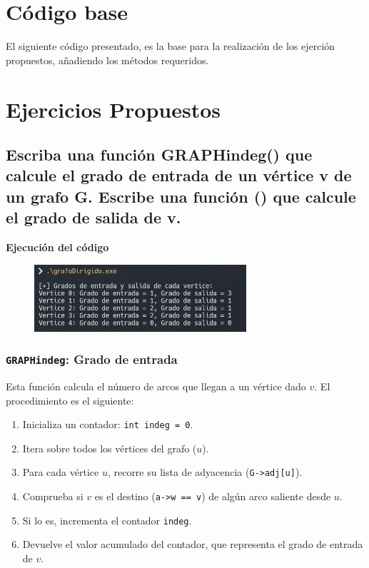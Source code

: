 \documentclass{article}
\begin{document}
\section{Código base}
    El siguiente código presentado, es la base para la realización de los ejerción propuestos, añadiendo los métodos requeridos. \\
    

    \newpage

\section{Ejercicios Propuestos}
    \subsection{Escriba una función GRAPHindeg() que calcule el grado de entrada de un vértice v de un grafo G. Escribe una función () que calcule el grado de salida de v.}

        

        \textbf{Ejecución del código}
            \begin{figure}[H]
            	\centering
             	\includegraphics[width=0.7\textwidth,keepaspectratio]{img/exercise1.png}
            \end{figure}

        \subsubsection*{\texttt{GRAPHindeg}: Grado de entrada}
            Esta función calcula el número de arcos que llegan a un vértice dado \( v \). El procedimiento es el siguiente:
            \begin{enumerate}
                \item Inicializa un contador: \texttt{int indeg = 0}.
                \item Itera sobre todos los vértices del grafo (\( u \)).
                \item Para cada vértice \( u \), recorre su lista de adyacencia (\texttt{G->adj[u]}).
                \item Comprueba si \( v \) es el destino (\texttt{a->w == v}) de algún arco saliente desde \( u \).
                \item Si lo es, incrementa el contador \texttt{indeg}.
                \item Devuelve el valor acumulado del contador, que representa el grado de entrada de \( v \).
            \end{enumerate}
            
\end{document}
